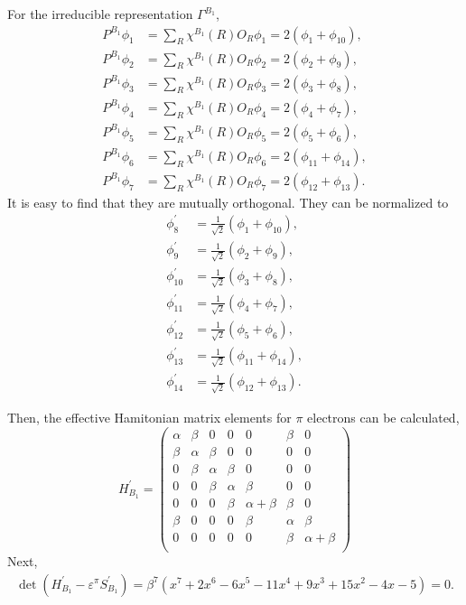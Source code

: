 \documentclass[a4paper]{book}
\newcommand{\Hp}{H^\prime}
\newcommand{\Sp}{S^\prime}
\begin{document}
\begin{solution}
\begin{enumerate}[label=(\alph*)]
		For the irreducible representation $\Gamma^{B_1}$,
		\begin{align*}
		P^{B_1}\phi_1 &= \sum_{R} \chi^{B_1}(R) O_R \phi_1 = 2(\phi_1 +\phi_{10}) , \\
		P^{B_1}\phi_2 &= \sum_{R} \chi^{B_1}(R) O_R \phi_2 = 2(\phi_2+\phi_9) ,	\\
		P^{B_1}\phi_3 &= \sum_{R} \chi^{B_1}(R) O_R \phi_3 = 2(\phi_3+\phi_8) ,	\\
		P^{B_1}\phi_4 &= \sum_{R} \chi^{B_1}(R) O_R \phi_4 = 2(\phi_4+\phi_7) ,	\\
		P^{B_1}\phi_5 &= \sum_{R} \chi^{B_1}(R) O_R \phi_5 = 2(\phi_5+\phi_6) ,	\\
		P^{B_1}\phi_6 &= \sum_{R} \chi^{B_1}(R) O_R \phi_6 = 2(\phi_{11}+\phi_{14}) ,	\\
		P^{B_1}\phi_7 &= \sum_{R} \chi^{B_1}(R) O_R \phi_7 = 2(\phi_{12}+\phi_{13}) .
		\end{align*}
		It is easy to find that they are mutually orthogonal. They can be normalized to
		\begin{align*}
		\phi^\prime_8 &= \frac{1}{\sqrt{2}} (\phi_1+\phi_{10}) , \\
		\phi^\prime_9 &= \frac{1}{\sqrt{2}} (\phi_2+\phi_9) , \\
		\phi^\prime_{10} &= \frac{1}{\sqrt{2}} (\phi_3+\phi_8) , \\
		\phi^\prime_{11} &= \frac{1}{\sqrt{2}} (\phi_4+\phi_7) , \\
		\phi^\prime_{12} &= \frac{1}{\sqrt{2}} (\phi_5+\phi_6) , \\
		\phi^\prime_{13} &= \frac{1}{\sqrt{2}} (\phi_{11}+\phi_{14}) , \\		
		\phi^\prime_{14} &= \frac{1}{\sqrt{2}} (\phi_{12}+\phi_{13}) .
		\end{align*}
		
		Then, the effective Hamitonian matrix elements for $\pi$ electrons can be calculated,
		\begin{equation*}
			\Hp_{B_1} = \begin{pmatrix}
\alpha&\beta&	0	&	0	&		0	&	\beta 	&	0	\\
\beta&\alpha&\beta	&	0	&		0	&	0	&	0	\\
0	&\beta	&\alpha	&\beta	&		0	&	0	&	0	\\
0	&	0	&\beta	&\alpha	&	\beta	&	0	&	0	\\
0	&	0	&	0	&\beta	&\alpha+\beta&	\beta	&	0\\
\beta&	0	&	0	&	0	& \beta		&	\alpha	&	\beta \\
0	&	0	&	0	&	0	&	0		&	\beta	&\alpha+\beta\\
			\end{pmatrix}					
		\end{equation*}
		Next,
		\begin{align*}
			\det(\Hp_{B_1}-\varepsilon^\pi \Sp_{B_1}) = \beta^7 ( x^7 + 2x^6 - 6x^5 - 11x^4 + 9x^3 +15x^2 -4x -5 ) = 0.
		\end{align*}
		

\end{enumerate}
\end{solution}
\end{document}
